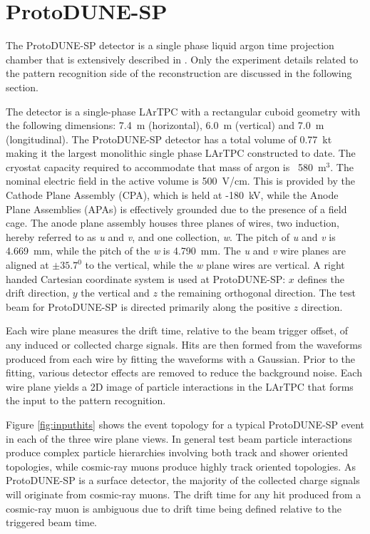 \section{ProtoDUNE-SP}
\label{sec:protodunesp}
The ProtoDUNE-SP detector is a single phase liquid argon time projection chamber that is extensively described in \cite{pdtdr}.  Only the experiment details related to the pattern recognition side of the reconstruction are discussed in the following section.

The detector is a single-phase LArTPC with a rectangular cuboid geometry with the following dimensions: 7.4~m (horizontal), 6.0~m (vertical) and 7.0~m (longitudinal).  The ProtoDUNE-SP detector has a total volume of 0.77~kt making it the largest monolithic single phase LArTPC constructed to date.  The cryostat capacity required to accommodate that mass of argon is ~580~$ \text{m}^{3}$.  The nominal electric field in the active volume is 500~V/cm.  This is provided by the Cathode Plane Assembly (CPA), which is held at -180~kV, while the Anode Plane Assemblies (APAs) is effectively grounded due to the presence of a field cage.  The anode plane assembly houses three planes of wires, two induction, hereby referred to as \textit{u} and \textit{v}, and one collection, \textit{w}.  The pitch of \textit{u} and \textit{v} is 4.669~mm, while the pitch of the \textit{w} is 4.790~mm.  The \textit{u} and \textit{v} wire planes are aligned at $\pm35.7^{0}$ to the vertical, while the \textit{w} plane wires are vertical.  A right handed Cartesian coordinate system is used at ProtoDUNE-SP: $x$ defines the drift direction, $y$ the vertical and $z$ the remaining orthogonal direction.  The test beam for ProtoDUNE-SP is directed primarily along the positive $z$ direction.  

Each wire plane measures the drift time, relative to the beam trigger offset, of any induced or collected charge signals.  Hits are then formed from the waveforms produced from each wire by fitting the waveforms with a Gaussian.  Prior to the fitting, various detector effects are removed to reduce the background noise.  Each wire plane yields a 2D image of particle interactions in the LArTPC that forms the input to the pattern recognition.

Figure \ref{fig:inputhits} shows the event topology for a typical ProtoDUNE-SP event in each of the three wire plane views.  In general test beam particle interactions produce complex particle hierarchies involving both track and shower oriented topologies, while cosmic-ray muons produce highly track oriented topologies.  As ProtoDUNE-SP is a surface detector, the majority of the collected charge signals will originate from cosmic-ray muons.  The drift time for any hit produced from a cosmic-ray muon is ambiguous due to drift time being defined relative to the triggered beam time.

